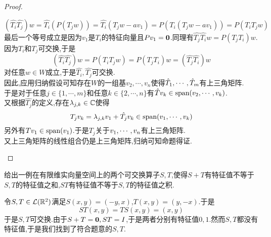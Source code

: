 \documentclass{ctexart}
\begin{document}
\begin{proof}
\begin{enumerate}[label=\tbf{(\arabic*)}]
            \[(\hat{T_i}\hat{T_j})w=\hat{T_i}(P(T_jw))=\hat{T_i}(T_jw-av_1)=P(T_i(T_jw-av_1))=P(T_iT_jw)\]
            最后一个等号成立是因为$v_1$是$T_i$的特征向量且$Pv_1=\mathbf0$.同理有$\hat{T_j}\hat{T_i}w=P(T_jT_i)w$.\\
            因为$T_i$和$T_j$可交换,于是
            \[(\hat{T_i}\hat{T_j})w=P(T_iT_jw)=P(T_jT_i)w=(\hat{T_j}\hat{T_i})w\]
            对任意$w\in W$成立,于是$\hat{T_i},\hat{T_j}$可交换.\\
            因此,应用归纳假设可知存在$W$的一组基$v_2,\cdots,v_n$使得${\hat{T}}_1,\cdots,{\hat{T}}_{m}$有上三角矩阵.\\
            于是对于任意$j\in\{1,\cdots,m\}$和任意$k\in\{2,\cdots,n\}$有$\hat{T}v_k\in\text{span}(v_2,\cdots,v_k)$.\\
            又根据$\hat{T_j}$的定义,存在$\lambda_{j,k}\in\mathbb{C}$使得
            \[T_jv_k=\lambda_{j,k}v_1+\hat{T_j}v_k\in\text{span}({v}_1,\cdots,{v}_{k})\]
            另外有$Tv_1\in\text{span}(v_1)$.于是$T_j$关于${v}_1,\cdots,{v}_{n}$有上三角矩阵.\\
            又上三角矩阵的线性组合仍是上三角矩阵,归纳可知命题得证.
    \end{enumerate}
\end{proof}
\begin{problem}[10.]
    给出一例在有限维实向量空间上的两个可交换算子$S,T$,使得$S+T$有特征值不等于$S,T$的特征值之和,$ST$有特征值不等于$S,T$的特征值之积.
\end{problem}
\begin{solution}
    令$S,T\in\mathcal{L}(\mathbb{R}^2)$满足$S(x,y)=(-y,x)$,$T(x,y)=(y,-x)$.于是
    \[ST(x,y)=TS(x,y)=(x,y)\]
    于是$S,T$可交换.由于$S+T=\mathbf0,ST=I$,于是两者分别有特征值$0,1$.然而$S,T$都没有特征值,于是我们找到了符合题意的$S,T$.
\end{solution}
\end{document}
